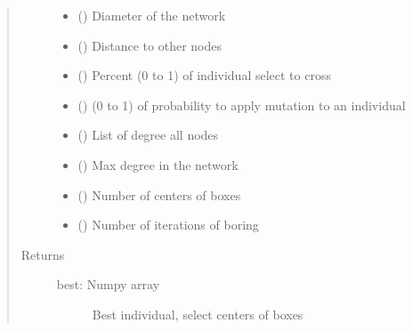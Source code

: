 \documentclass[letterpaper,10pt,english]{sphinxmanual}
\begin{document}
\begin{fulllineitems}
\begin{quote}
\begin{description}
\begin{itemize}
\item {} 
 () \textendash{} Diameter of the network

\item {} 
 () \textendash{} Distance to other nodes

\item {} 
 () \textendash{} Percent (0 to 1) of individual select to cross

\item {} 
 () \textendash{} (0 to 1) of probability to apply mutation to an individual

\item {} 
 () \textendash{} List of degree all nodes

\item {} 
 () \textendash{} Max degree in the network

\item {} 
 () \textendash{} Number of centers of boxes

\item {} 
 () \textendash{} Number of iterations of boring

\end{itemize}

\item[{Returns}] \leavevmode
\begin{description}
\item[{best: Numpy array}] \leavevmode
Best individual, select centers of boxes

\end{description}


\end{description}\end{quote}

\end{fulllineitems}
\end{document}
